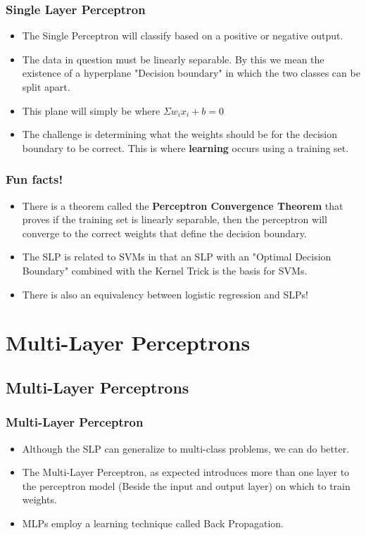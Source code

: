 \documentclass{beamer}
\begin{document}
\begin{frame}
\frametitle{Single Layer Perceptron}
\begin{itemize}
\item The Single Perceptron will classify based on a positive or negative output.

\item The data in question must be linearly separable. By this we mean the existence of a hyperplane "Decision boundary" in which the two classes can be split apart.
\item This plane will simply be where $\Sigma w_ix_i + b = 0 $
\item The challenge is determining what the weights should be for the decision boundary to be correct. This is where \textbf{learning} occurs using a training set.
\end{itemize}
\end{frame}

\begin{frame}
\frametitle{Fun facts!}

\begin{itemize}
\item There is a theorem called the \textbf{Perceptron Convergence Theorem}
that proves if the training set is linearly separable, then the perceptron will converge to the correct weights that define the decision boundary.
\item The SLP is related to SVMs in that an SLP with an "Optimal Decision Boundary" combined with the Kernel Trick is the basis for SVMs.
\item There is also an equivalency between logistic regression and SLPs! 
\end{itemize}
\end{frame}

\section{Multi-Layer Perceptrons}
\subsection{Multi-Layer Perceptrons}
\begin{frame}
\frametitle{Multi-Layer Perceptron}
\begin{itemize}
\item Although the SLP can generalize to multi-class problems, we can do better.
\item The Multi-Layer Perceptron, as expected introduces more than one layer to the perceptron model (Beside the input and output layer) on which to train weights. 
\item MLPs employ a learning technique called Back Propagation.
\end{itemize} 
\end{frame}
\end{document}
